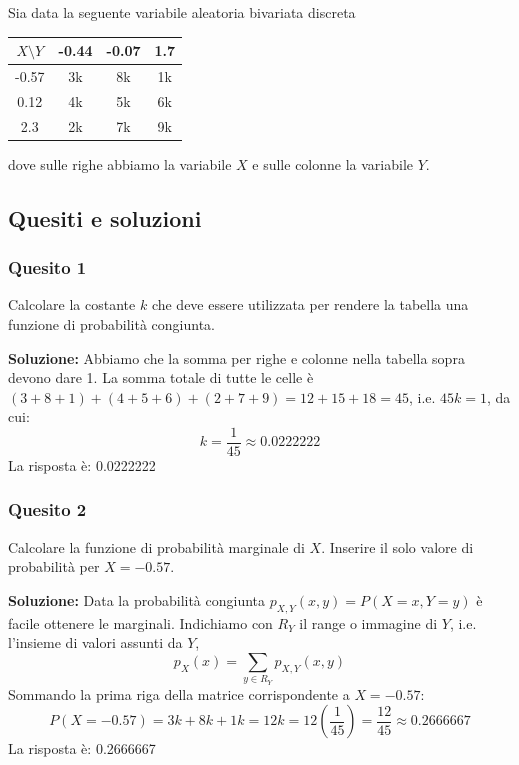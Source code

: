 \documentclass[12pt, a4paper]{article}
\begin{document}
\vspace{0.5cm}
\begin{tcolorbox}[colback=lightergray!10, colframe=tocsec, title=\textbf{Esercizio 4}]
Sia data la seguente variabile aleatoria bivariata discreta 
\begin{center}
\begin{tabular}{c|ccc}
\toprule
$X \setminus Y$ & -0.44 & -0.07 & 1.7 \\
\midrule
-0.57 & 3k & 8k & 1k \\
0.12 & 4k & 5k & 6k \\
2.3 & 2k & 7k & 9k \\
\bottomrule
\end{tabular}
\end{center}
dove sulle righe abbiamo la variabile $X$ e sulle colonne la variabile $Y$.
\end{tcolorbox}

\subsection*{Quesiti e soluzioni}

\subsubsection*{Quesito 1}
Calcolare la costante $k$ che deve essere utilizzata per rendere la tabella una funzione di probabilità congiunta.

\textbf{Soluzione:}
Abbiamo che la somma per righe e colonne nella tabella sopra devono dare 1. La somma totale di tutte le celle è $(3+8+1) + (4+5+6) + (2+7+9) = 12 + 15 + 18 = 45$, i.e. $45k = 1$, da cui:
$$ k = \frac{1}{45} \approx 0.0222222 $$
La risposta è: 0.0222222

\subsubsection*{Quesito 2}
Calcolare la funzione di probabilità marginale di $X$. Inserire il solo valore di probabilità per $X=-0.57$.

\textbf{Soluzione:}
Data la probabilità congiunta $p_{X,Y}(x,y)=P(X=x,Y=y)$ è facile ottenere le marginali.
Indichiamo con $R_Y$ il range o immagine di $Y$, i.e. l’insieme di valori assunti da $Y$, 
$$ p_X(x) = \sum_{y \in R_Y} p_{X,Y}(x,y) $$
Sommando la prima riga della matrice corrispondente a $X=-0.57$:
$$ P(X=-0.57) = 3k + 8k + 1k = 12k = 12 \left(\frac{1}{45}\right) = \frac{12}{45} \approx 0.2666667 $$
La risposta è: 0.2666667
\end{document}
